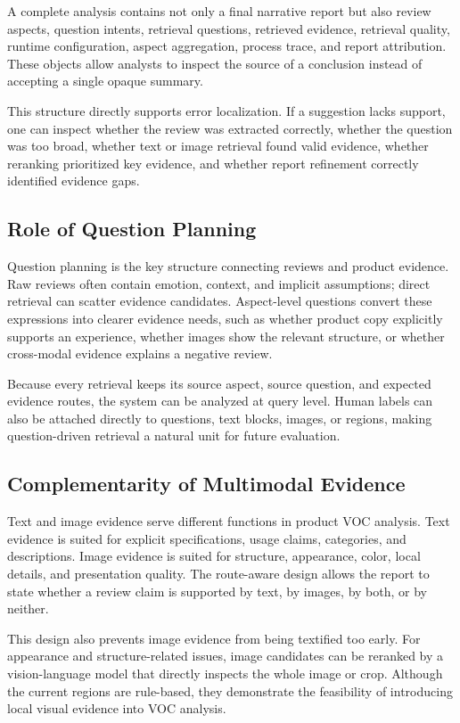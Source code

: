 \documentclass[11pt]{article}
\begin{document}
A complete analysis contains not only a final narrative report but also review aspects, question intents, retrieval questions, retrieved evidence, retrieval quality, runtime configuration, aspect aggregation, process trace, and report attribution. These objects allow analysts to inspect the source of a conclusion instead of accepting a single opaque summary.

This structure directly supports error localization. If a suggestion lacks support, one can inspect whether the review was extracted correctly, whether the question was too broad, whether text or image retrieval found valid evidence, whether reranking prioritized key evidence, and whether report refinement correctly identified evidence gaps.

\subsection{Role of Question Planning}

Question planning is the key structure connecting reviews and product evidence. Raw reviews often contain emotion, context, and implicit assumptions; direct retrieval can scatter evidence candidates. Aspect-level questions convert these expressions into clearer evidence needs, such as whether product copy explicitly supports an experience, whether images show the relevant structure, or whether cross-modal evidence explains a negative review.

Because every retrieval keeps its source aspect, source question, and expected evidence routes, the system can be analyzed at query level. Human labels can also be attached directly to questions, text blocks, images, or regions, making question-driven retrieval a natural unit for future evaluation.

\subsection{Complementarity of Multimodal Evidence}

Text and image evidence serve different functions in product VOC analysis. Text evidence is suited for explicit specifications, usage claims, categories, and descriptions. Image evidence is suited for structure, appearance, color, local details, and presentation quality. The route-aware design allows the report to state whether a review claim is supported by text, by images, by both, or by neither.

This design also prevents image evidence from being textified too early. For appearance and structure-related issues, image candidates can be reranked by a vision-language model that directly inspects the whole image or crop. Although the current regions are rule-based, they demonstrate the feasibility of introducing local visual evidence into VOC analysis.
\end{document}
